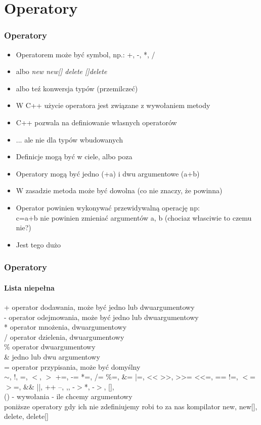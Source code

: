 \documentclass[10pt]{beamer}
\begin{document}
\section{Operatory}

\begin{frame}[fragile]
  \frametitle{Operatory}
      \begin{itemize}
        \item Operatorem może być symbol, np.: +, -, *, /
        \item albo \textit{new new[] delete []delete}
        \item albo teź konwersja typów (przemilczeć)
        \item W C++ użycie operatora jest związane z wywołaniem metody
        \item C++ pozwala na definiowanie własnych operatorów
        \item ... ale nie dla typów wbudowanych
        \item Definicje mogą być w ciele, albo poza
        \item Operatory mogą być jedno (+a) i dwu argumentowe (a+b)
        \item W zasadzie metoda może być dowolna (co nie znaczy, że powinna)
        \item Operator powinien wykonywać przewidywalną operację np: \\
        c=a+b nie powinien zmieniać argumentów a, b (chociaz własciwie to czemu nie?)
        \item Jest tego dużo
      \end{itemize}
\end{frame}

\begin{frame}[fragile]
  \frametitle{Operatory}
  \framesubtitle{Lista niepełna}
          + operator dodawania, może być jedno lub dwuargumentowy\\
          - operator odejmowania, może być jedno lub dwuargumentowy\\
          * operator mnożenia, dwuargumentowy\\
          / operator dzielenia, dwuargumentowy\\
          \% operator dwuargumentowy\\
          \& jedno lub dwu argumentowy\\
          = operator przypisania, może być domyślny\\
$\sim$, !, =, 
$<$, $>$
+=, -=
*=, /=
\%=, \&=
|=, <<
>>, >>=
<<=, ==
!=, $<$=
$>$=, \&\&
||, ++
--, ,, -$>$*, -$>$, [], \\
() - wywołania - ile chcemy argumentowy\\
poniższe operatory gdy ich nie zdefiniujemy robi to za nas kompilator
new, new[], delete, delete[]

\end{frame}
\end{document}

